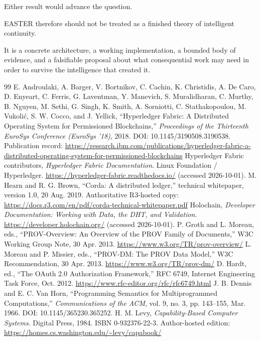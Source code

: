 \documentclass[11pt]{article}
\begin{document}
Either result would advance the question.

EASTER therefore should not be treated as a finished theory of intelligent continuity.

It is a concrete architecture, a working implementation, a bounded body of evidence, and a falsifiable proposal about what consequential work may need in order to survive the intelligence that created it.

\begin{thebibliography}{99}
 E. Androulaki, A. Barger, V. Bortnikov, C. Cachin, K. Christidis, A. De Caro, D. Enyeart, C. Ferris, G. Laventman, Y. Manevich, S. Muralidharan, C. Murthy, B. Nguyen, M. Sethi, G. Singh, K. Smith, A. Sorniotti, C. Stathakopoulou, M. Vukolić, S. W. Cocco, and J. Yellick, “Hyperledger Fabric: A Distributed Operating System for Permissioned Blockchains,” \textit{Proceedings of the Thirteenth EuroSys Conference (EuroSys ’18)}, 2018. DOI: 10.1145/3190508.3190538. Publication record: \url{https://research.ibm.com/publications/hyperledger-fabric-a-distributed-operating-system-for-permissioned-blockchains}
 Hyperledger Fabric contributors, \textit{Hyperledger Fabric Documentation}. Linux Foundation / Hyperledger. \url{https://hyperledger-fabric.readthedocs.io/} (accessed 2026-10-01).
 M. Hearn and R. G. Brown, “Corda: A distributed ledger,” technical whitepaper, version 1.0, 20 Aug. 2019. Authoritative R3-hosted copy: \url{https://docs.r3.com/en/pdf/corda-technical-whitepaper.pdf}
 Holochain, \textit{Developer Documentation: Working with Data, the DHT, and Validation}. \url{https://developer.holochain.org/} (accessed 2026-10-01).
 P. Groth and L. Moreau, eds., “PROV-Overview: An Overview of the PROV Family of Documents,” W3C Working Group Note, 30 Apr. 2013. \url{https://www.w3.org/TR/prov-overview/}
 L. Moreau and P. Missier, eds., “PROV-DM: The PROV Data Model,” W3C Recommendation, 30 Apr. 2013. \url{https://www.w3.org/TR/prov-dm/}
 D. Hardt, ed., “The OAuth 2.0 Authorization Framework,” RFC 6749, Internet Engineering Task Force, Oct. 2012. \url{https://www.rfc-editor.org/rfc/rfc6749.html}
 J. B. Dennis and E. C. Van Horn, “Programming Semantics for Multiprogrammed Computations,” \textit{Communications of the ACM}, vol. 9, no. 3, pp. 143--155, Mar. 1966. DOI: 10.1145/365230.365252.
 H. M. Levy, \textit{Capability-Based Computer Systems}. Digital Press, 1984. ISBN 0-932376-22-3. Author-hosted edition: \url{https://homes.cs.washington.edu/~levy/capabook/}

\end{thebibliography}
\end{document}
